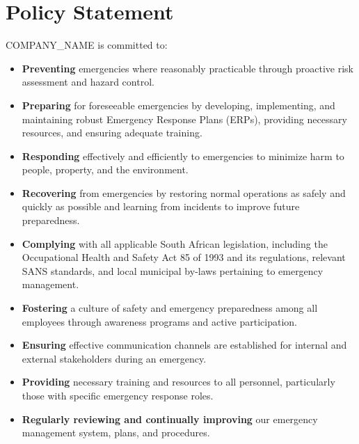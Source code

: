 \documentclass[12pt]{article}
\begin{document}
\section{Policy Statement}
{{COMPANY_NAME}} is committed to:
\begin{itemize}
    \item \textbf{Preventing} emergencies where reasonably practicable through proactive risk assessment and hazard control.
    \item \textbf{Preparing} for foreseeable emergencies by developing, implementing, and maintaining robust Emergency Response Plans (ERPs), providing necessary resources, and ensuring adequate training.
    \item \textbf{Responding} effectively and efficiently to emergencies to minimize harm to people, property, and the environment.
    \item \textbf{Recovering} from emergencies by restoring normal operations as safely and quickly as possible and learning from incidents to improve future preparedness.
    \item \textbf{Complying} with all applicable South African legislation, including the Occupational Health and Safety Act 85 of 1993 and its regulations, relevant SANS standards, and local municipal by-laws pertaining to emergency management.
    \item \textbf{Fostering} a culture of safety and emergency preparedness among all employees through awareness programs and active participation.
    \item \textbf{Ensuring} effective communication channels are established for internal and external stakeholders during an emergency.
    \item \textbf{Providing} necessary training and resources to all personnel, particularly those with specific emergency response roles.
    \item \textbf{Regularly reviewing and continually improving} our emergency management system, plans, and procedures.
\end{itemize}
\end{document}

